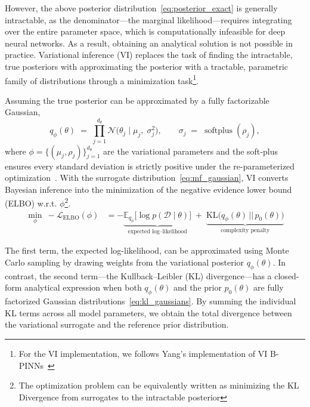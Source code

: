 \documentclass[preprint,12pt]{elsarticle}
\begin{document}
However, the above posterior distribution~\eqref{eq:posterior_exact} is generally intractable, as the denominator—the marginal likelihood—requires integrating over the entire parameter space, which is computationally infeasible for deep neural networks. As a result, obtaining an analytical solution is not possible in practice. Variational inference (VI) replaces the task of finding the intractable, true posteriors with approximating the posterior with a tractable, parametric family of distributions through a minimization task\footnote{For the VI implementation, we follows Yang's implementation of VI B-PINNs~\cite{yang_b-pinns_2021}}.

Assuming the true posterior can be approximated by a fully factorizable Gaussian, 
\begin{equation}
  q_{\phi}(\theta)
  \;=\;
  \prod_{j=1}^{d_\theta}
  \mathcal N\!\bigl(\theta_j \mid \mu_j,\;\sigma_j^{2}\bigr),
  \qquad
  \sigma_j \;=\; \operatorname{softplus}(\rho_j),
  \label{eq:mf_gaussian}
\end{equation}
where $\phi=\{(\mu_j,\rho_j)\}_{j=1}^{d_\theta}$ are the variational
parameters and the soft‐plus ensures every standard deviation is strictly
positive under the re-parameterized optimization~\cite{blundell_weight_2015}. With the surrogate distribution~\eqref{eq:mf_gaussian}, VI converts Bayesian inference into the minimization of the negative evidence lower bound (ELBO) w.r.t. $\phi$\footnote{The optimization problem can be equivalently written as minimizing the KL Divergence from surrogates to the intractable posterior}.
\begin{align}
  \min_{\phi}\ - \mathcal L_{\mathrm{ELBO}}(\phi) 
  &= -
     \underbrace{\mathbb E_{q_{\phi}}
       \!\bigl[\log p(\mathcal D\mid\theta)\bigr]}_{\text{expected log–likelihood}}
     \;+\;
     \underbrace{\mathrm{KL}\!\bigl(q_{\phi}(\theta)\,||\,p_{0}(\theta)\bigr)}_{\text{complexity penalty}}
  \label{eq:elbo}
\end{align}

The first term, the expected log-likelihood, can be approximated using Monte Carlo sampling by drawing weights from the variational posterior \( q_{\phi}(\theta) \). In contrast, the second term—the Kullback–Leibler (KL) divergence—has a closed-form analytical expression when both \( q_{\phi}(\theta) \) and the prior \( p_0(\theta) \) are fully factorized Gaussian distributions~\eqref{eq:kl_gaussians}. By summing the individual KL terms across all model parameters, we obtain the total divergence between the variational surrogate and the reference prior distribution.
\end{document}
